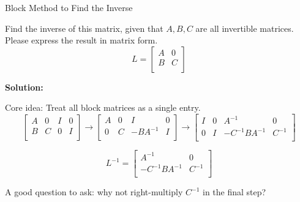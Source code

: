 \documentclass{beamer}
\begin{document}
\begin{frame}{Block Method to Find the Inverse}
\begin{example}
    Find the inverse of this matrix, given that $A,B,C$ are all invertible matrices. Please express the result in matrix form.
    \begin{equation*}
        L=\left[ \begin{matrix}
            A&		0\\
            B&		C\\
        \end{matrix} \right]
    \end{equation*}
\end{example}

\textbf{Solution:}

Core idea: Treat all block matrices as a single entry.
\begin{equation*}
    \left[ \begin{matrix}
        A&		0&		I&		0\\
        B&		C&		0&		I\\
    \end{matrix} \right] \rightarrow \left[ \begin{matrix}
        A&		0&		I&		0\\
        0&		C&		-BA^{-1}&		I\\
    \end{matrix} \right] \rightarrow \left[ \begin{matrix}
        I&		0&		A^{-1}&		0\\
        0&		I&		-C^{-1}BA^{-1}&		C^{-1}\\
    \end{matrix} \right]
\end{equation*}

\begin{equation*}
    L^{-1}=\left[ \begin{matrix}
        A^{-1}&		0\\
        -C^{-1}BA^{-1}&		C^{-1}\\
    \end{matrix} \right]
\end{equation*}

A good question to ask: why not right-multiply $C^{-1}$ in the final step?
\end{frame}
\end{document}

